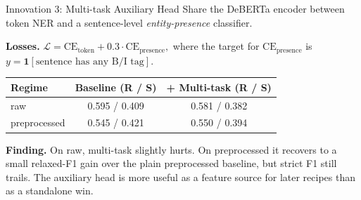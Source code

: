 \documentclass[aspectratio=169,10pt]{beamer}
\begin{document}
\begin{frame}{Innovation 3: Multi-task Auxiliary Head}
  Share the DeBERTa encoder between token NER and a sentence-level \emph{entity-presence} classifier.

  \begin{center}\scriptsize
  \end{center}

  \footnotesize
  \textbf{Losses.} $\displaystyle \mathcal{L} = \text{CE}_{\text{token}} + 0.3 \cdot \text{CE}_{\text{presence}},$ where
  the target for $\text{CE}_{\text{presence}}$ is $y = \mathbf{1}[\text{sentence has any B/I tag}]$.
  \smallskip

  \begin{center}\footnotesize
  \begin{tabular}{lcc}
    \toprule
    Regime & Baseline (R / S) & + Multi-task (R / S) \\
    \midrule
    raw & 0.595 / 0.409 & 0.581 / 0.382 \\
    preprocessed & 0.545 / 0.421 & 0.550 / 0.394 \\
    \bottomrule
  \end{tabular}
  \end{center}
  \smallskip

  \textbf{Finding.} On raw, multi-task slightly hurts. On preprocessed it recovers to a small relaxed-F1 gain over the plain preprocessed baseline, but strict F1 still trails. The auxiliary head is more useful as a feature source for later recipes than as a standalone win.
\end{frame}
\end{document}
